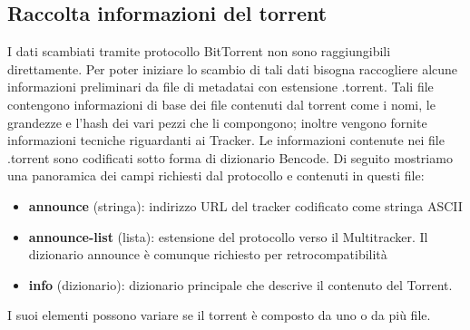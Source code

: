 \documentclass[a4]{book}
\begin{document}
\subsection{Raccolta informazioni del torrent}
I dati scambiati tramite protocollo BitTorrent non sono raggiungibili direttamente. Per poter iniziare lo scambio di tali dati bisogna raccogliere alcune informazioni preliminari da file di metadatai con estensione .torrent. Tali file contengono informazioni di base dei file contenuti dal torrent come i nomi, le grandezze e l'hash dei vari pezzi che li compongono; inoltre vengono fornite informazioni tecniche riguardanti ai Tracker.
Le informazioni contenute nei file .torrent sono codificati sotto forma di dizionario Bencode.\newline\newline
Di seguito mostriamo una panoramica dei campi richiesti dal protocollo e contenuti in questi file:
\begin{itemize}
	\item \textbf{announce} (stringa): indirizzo URL del tracker codificato come stringa ASCII
	\item \textbf{announce-list} (lista): estensione del protocollo verso il Multitracker. Il dizionario announce è comunque richiesto per retrocompatibilità\newline
	\item \textbf{info} (dizionario): dizionario principale che descrive il contenuto del Torrent.
\end{itemize}
	
I suoi elementi possono variare se il torrent è composto da uno o da più file.
\end{document}
